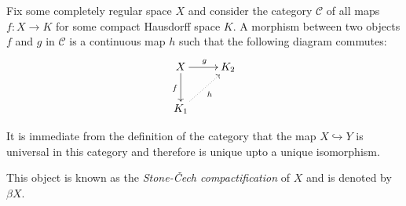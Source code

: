 Fix some completely regular space $X$ and consider the category $\mathscr C$ of all maps $f: X\to K$ for some compact Hausdorff space $K$. A morphism between two objects $f$ and $g$ in $\mathscr C$ is a continuous map $h$ such that the following diagram commutes: 
\begin{equation*}
\xymatrix {
    X\ar[d]_f\ar[r]^g & K_2\\
    K_1\ar@{.>}[ru]_h
}
\end{equation*}

It is immediate from the definition of the category that the map $X\hookrightarrow Y$ is universal in this category and therefore is unique upto a unique isomorphism. 

This object is known as the \textit{Stone-\v{C}ech compactification} of $X$ and is denoted by $\beta X$.